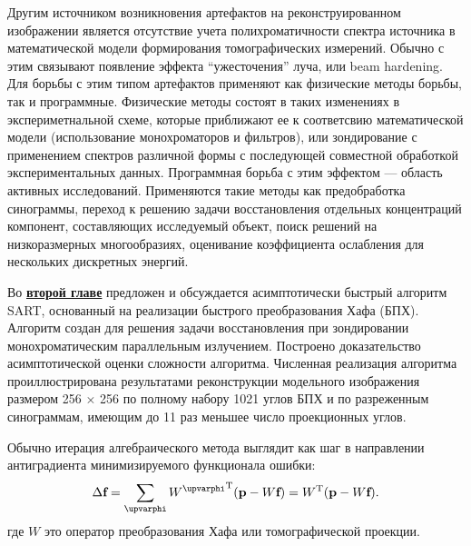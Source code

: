 Другим источником возникновения артефактов на реконструированном изображении является отсутствие учета полихроматичности спектра источника в математической модели формирования томографических измерений.
Обычно с этим связывают появление эффекта ``ужесточения'' луча, или beam hardening.
Для борьбы с этим типом артефактов применяют как физические методы борьбы, так и программные.
Физические методы состоят в таких изменениях в экспериметнальной схеме, которые приближают ее к соответсвию математической модели (использование монохроматоров и фильтров), или зондирование с применением спектров различной формы с последующей совместной обработкой экспериментальных данных.
Программная борьба с этим эффектом --- область активных исследований.
Применяются такие методы как предобработка синограммы, переход к решению задачи восстановления отдельных концентраций компонент, составляющих исследуемый объект, поиск решений на низкоразмерных многообразиях, оценивание коэффициента ослабления для нескольких дискретных энергий. %

\vspace{5mm}

Во \underline{\textbf{второй главе}} предложен и обсуждается асимптотически быстрый алгоритм SART, основанный на реализации быстрого преобразования Хафа (БПХ).
Алгоритм создан для решения задачи восстановления при зондировании монохроматическим параллельным излучением.
Построено доказательство асимптотической оценки сложности алгоритма.
Численная реализация алгоритма проиллюстрирована результатами реконструкции модельного изображения размером 256 $\times$ 256 по полному набору 1021 углов БПХ и по разреженным синограммам, имеющим до 11 раз меньшее число проекционных углов.


Обычно итерация алгебраического метода выглядит как шаг в направлении антиградиента минимизируемого функционала ошибки:
\begin{equation}\notag
  \Delta \textbf f = \sum_\varphi {{W^\varphi}^{\mathrm T}(\textbf p - W\textbf f) } = W^{\mathrm T}(\textbf p - W \textbf f).
\end{equation}
где $W$ это оператор преобразования Хафа или томографической проекции.
  
